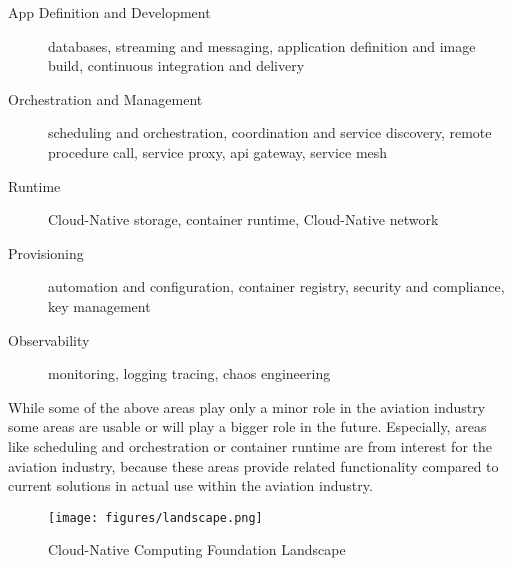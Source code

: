 \documentclass[titlepage]{report}
\begin{document}
\begin{description}
    \item[App Definition and Development] databases, streaming and messaging, application definition and image build, continuous integration and delivery
    \item[Orchestration and Management] scheduling and orchestration, coordination and service discovery, remote procedure call, service proxy, api gateway, service mesh
    \item[Runtime] Cloud-Native storage, container runtime, Cloud-Native network
    \item[Provisioning] automation and configuration, container registry, security and compliance, key management
    \item[Observability] monitoring, logging tracing, chaos engineering
\end{description}

While some of the above areas play only a minor role in the aviation industry some areas are usable or will play a bigger role in the future.
Especially, areas like scheduling and orchestration or container runtime are from interest for the aviation industry, because
these areas provide related functionality compared to current solutions in actual use within the aviation industry.

\begin{figure}[H]
    \centering
    \texttt{[image: figures/landscape.png]}
    \caption{Cloud-Native Computing Foundation Landscape}\label{fig:landscape}
\end{figure}
 
\end{document}
